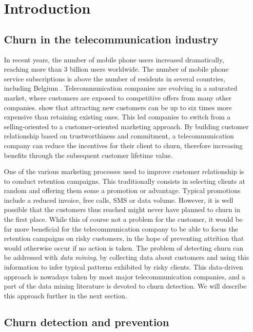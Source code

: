 \chapter{Introduction}
\label{ch:intro}

\section{Churn in the telecommunication industry}

In recent years, the number of mobile phone users increased dramatically,
reaching more than 3 billion users worldwide. The number of mobile phone service
subscriptions is above the number of residents in several countries, including
Belgium \parencite{itu2018ict}. Telecommunication companies are evolving in a
saturated market, where customers are exposed to competitive offers from many
other companies. \textcite{hadden2007computer} show that attracting new
customers can be up to six times more expensive than retaining existing ones.
This led companies to switch from a selling-oriented to a customer-oriented
marketing approach. By building customer relationship based on trustworthiness
and commitment, a telecommunication company can reduce the incentives for their
client to churn, therefore increasing benefits through the subsequent customer
lifetime value.

One of the various marketing processes used to improve customer relationship is
to conduct retention campaigns. This traditionally consists in selecting clients
at random and offering them some a promotion or advantage. Typical promotions
include a reduced invoice, free calls, SMS or data volume. However, it is well
possible that the customers thus reached might never have planned to churn in
the first place. While this of course not a problem for the customer, it would
be far more beneficial for the telecommunication company to be able to focus the
retention campaigns on risky customers, in the hope of preventing attrition that
would otherwise occur if no action is taken. The problem of detecting churn can
be addressed with \emph{data mining}, by collecting data about customers and
using this information to infer typical patterns exhibited by risky clients.
This data-driven approach is nowadays taken by most major telecommunication
companies, and a part of the data mining literature is devoted to churn
detection. We will describe this approach further in the next section.



\section{Churn detection and prevention}

